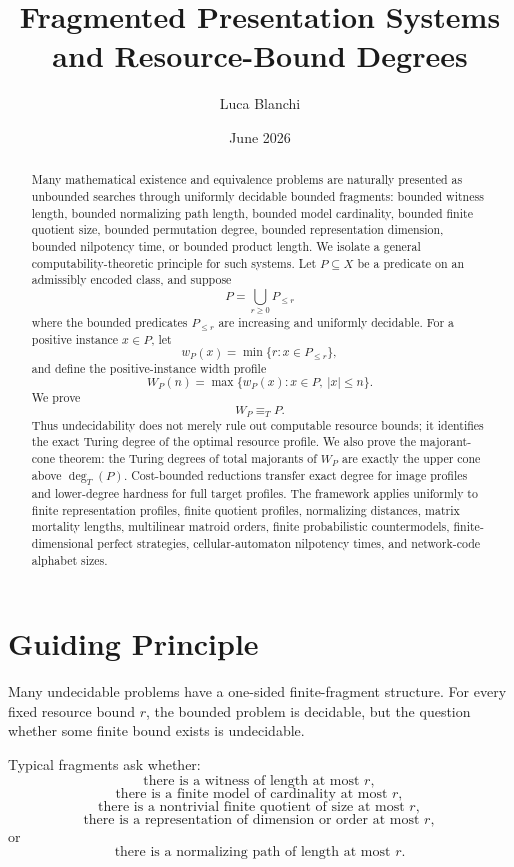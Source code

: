 \documentclass[11pt]{article}
\title{Fragmented Presentation Systems and Resource-Bound Degrees}
\author{Luca Blanchi}
\date{June 2026}
\begin{document}
\maketitle

\begin{abstract}
Many mathematical existence and equivalence problems are naturally presented as unbounded searches through uniformly decidable bounded fragments: bounded witness length, bounded normalizing path length, bounded model cardinality, bounded finite quotient size, bounded permutation degree, bounded representation dimension, bounded nilpotency time, or bounded product length. We isolate a general computability-theoretic principle for such systems. Let \(P\subseteq X\) be a predicate on an admissibly encoded class, and suppose
\[
P=\bigcup_{r\ge 0}P_{\le r}
\]
where the bounded predicates \(P_{\le r}\) are increasing and uniformly decidable. For a positive instance \(x\in P\), let
\[
w_P(x)=\min\{r:x\in P_{\le r}\},
\]
and define the positive-instance width profile
\[
W_P(n)=\max\{w_P(x):x\in P,\ |x|\le n\}.
\]
We prove
\[
W_P\equiv_T P.
\]
Thus undecidability does not merely rule out computable resource bounds; it identifies the exact Turing degree of the optimal resource profile. We also prove the majorant-cone theorem: the Turing degrees of total majorants of \(W_P\) are exactly the upper cone above \(\deg_T(P)\). Cost-bounded reductions transfer exact degree for image profiles and lower-degree hardness for full target profiles. The framework applies uniformly to finite representation profiles, finite quotient profiles, normalizing distances, matrix mortality lengths, multilinear matroid orders, finite probabilistic countermodels, finite-dimensional perfect strategies, cellular-automaton nilpotency times, and network-code alphabet sizes.
\end{abstract}

\section{Guiding Principle}

Many undecidable problems have a one-sided finite-fragment structure. For every fixed resource bound \(r\), the bounded problem is decidable, but the question whether some finite bound exists is undecidable.

Typical fragments ask whether:
\[
\text{there is a witness of length at most }r,
\]
\[
\text{there is a finite model of cardinality at most }r,
\]
\[
\text{there is a nontrivial finite quotient of size at most }r,
\]
\[
\text{there is a representation of dimension or order at most }r,
\]
or
\[
\text{there is a normalizing path of length at most }r.
\]
\end{document}
